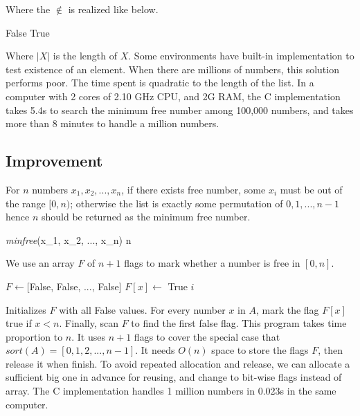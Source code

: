 \documentclass[b5paper]{article}
\begin{document}
Where the $\notin$ is realized like below.

\begin{algorithmic}[1]
      \State \Return False
    \EndIf
  \EndFor
  \State \Return True
\EndFunction
\end{algorithmic}

Where $|X|$ is the length of $X$. Some environments have built-in implementation to test existence of an element. When there are millions of numbers, this solution performs poor. The time spent is quadratic to the length of the list. In a computer with 2 cores of 2.10 GHz CPU, and 2G RAM, the C implementation takes 5.4s to search the minimum free number among 100,000 numbers, and takes more than 8 minutes to handle a million numbers.

\subsection*{Improvement}
For $n$ numbers $x_1, x_2, ..., x_n$, if there exists free number, some $x_i$ must be out of the range $[0, n)$; otherwise the list is exactly some permutation of $0, 1, ..., n - 1$ hence $n$ should be returned as the minimum free number.

\be
\textit{minfree}(x_1, x_2, ..., x_n) \leq n
\label{min-free}
\ee

We use an array $F$ of $n + 1$ flags to mark whether a number is free in $[0, n]$.

\begin{algorithmic}[1]
  \State $F \gets $[False, False, ..., False] 
      \State $F[x] \gets$ True
    \EndIf
  \EndFor
      \State \Return $i$
    \EndIf
  \EndFor
\EndFunction
\end{algorithmic}

Initializes $F$ with all False values. For every number $x$ in $A$, mark the flag $F[x]$ true if $x < n$. Finally, scan $F$ to find the first false flag. This program takes time proportion to $n$. It uses $n + 1$ flags to cover the special case that $sort(A) = [0, 1, 2, ..., n-1]$. It needs $O(n)$ space to store the flags $F$, then release it when finish. To avoid repeated allocation and release, we can allocate a sufficient big one in advance for reusing, and change to bit-wise flags instead of array. The C implementation handles 1 million numbers in 0.023s in the same computer.
\end{document}
